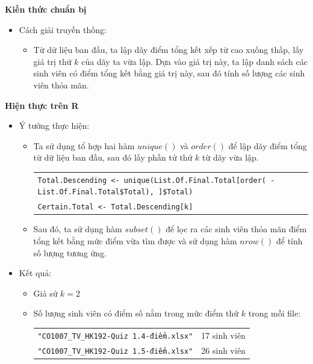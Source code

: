 \documentclass[a4paper]{article}
\theoremstyle{definition}
\begin{document}
\begin{enumerate}[a)]
{    \bf Kiến thức chuẩn bị\normalfont
    \begin{itemize}
        \item Cách giải truyền thống:
        \begin{itemize}
            \item Từ dữ liệu ban đầu, ta lập dãy điểm tổng kết xếp từ cao xuống thấp, lấy giá trị thứ $k$ của dãy ta vừa lập. Dựa vào giá trị này, ta lập danh sách các sinh viên có điểm tổng kết bằng giá trị này, sau đó tính số lượng các sinh viên thỏa mãn.
        \end{itemize}
    \end{itemize}
    \bf Hiện thực trên R\normalfont
    \begin{itemize}
        \item Ý tưởng thực hiện:
        \begin{itemize}
            \item Ta sử dụng tổ hợp hai hàm $unique()$ và $order()$ để lập dãy điểm tổng từ dữ liệu ban đầu, sau đó lấy phần tử thứ $k$ từ dãy vừa lập.
            \begin{center}
                \begin{tabular}{p{13cm}}
                    \texttt{Total.Descending <- unique(List.Of.Final.Total[order( -List.Of.Final.Total\$Total), ]\$Total)}\\
                    \texttt{Certain.Total <- Total.Descending[k]}
                \end{tabular}
            \end{center}
            \item Sau đó, ta sử dụng hàm $subset()$ để lọc ra các sinh viên thỏa mãn điểm tổng kết bằng mức điểm vừa tìm được và sử dụng hàm $nrow()$ để tính số lượng tương ứng.
        \end{itemize}
        \item Kết quả:
        \begin{itemize}
            \item Giả sử $k = 2$
            \item Số lượng sinh viên có điểm số nằm trong mức điểm thứ $k$ trong mỗi file:
            \begin{center}
                \begin{tabular}{l c}
                     \texttt{"CO1007\_TV\_HK192-Quiz 1.4-điểm.xlsx"} & 17 sinh viên\\
                     \texttt{"CO1007\_TV\_HK192-Quiz 1.5-điểm.xlsx"} & 26 sinh viên\\

\end{tabular}
\end{center}
\end{itemize}
\end{itemize}}
\end{enumerate}
\end{document}
